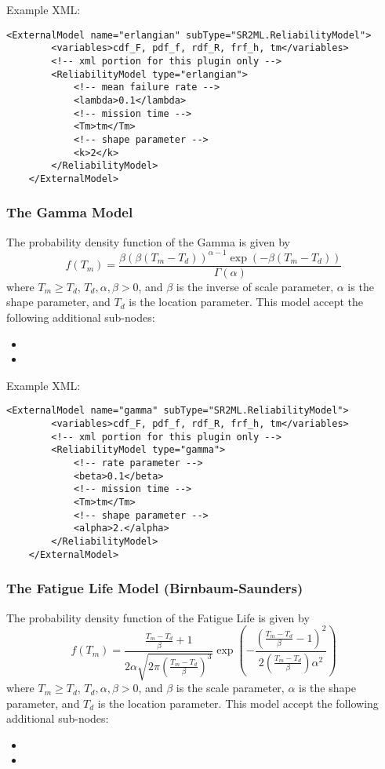 Example XML:
\begin{lstlisting}[style=XML]
	<ExternalModel name="erlangian" subType="SR2ML.ReliabilityModel">
		<variables>cdf_F, pdf_f, rdf_R, frf_h, tm</variables>
		<!-- xml portion for this plugin only -->
		<ReliabilityModel type="erlangian">
			<!-- mean failure rate -->
			<lambda>0.1</lambda>
			<!-- mission time -->
			<Tm>tm</Tm>
			<!-- shape parameter -->
			<k>2</k>
		</ReliabilityModel>
	</ExternalModel>
\end{lstlisting}


\subsubsection{The Gamma Model}
The probability density function of the Gamma is given by
\begin{equation}
	f(T_m) = \frac{\beta \left(\beta \left(T_m-T_d\right)\right)^{\alpha-1}\exp\left(-\beta\left(T_m-T_d\right)\right)}{\Gamma \left(\alpha\right)}
\end{equation}
where $T_m\geq T_d$, $T_d, \alpha, \beta >0$, and $\beta$ is the inverse of scale parameter, $\alpha$ is the shape
parameter, and $T_d$ is the location parameter.
This model accept the following additional sub-nodes:
\begin{itemize}
	\item {}
	\item {}
\end{itemize}

Example XML:
\begin{lstlisting}[style=XML]
	<ExternalModel name="gamma" subType="SR2ML.ReliabilityModel">
		<variables>cdf_F, pdf_f, rdf_R, frf_h, tm</variables>
		<!-- xml portion for this plugin only -->
		<ReliabilityModel type="gamma">
			<!-- rate parameter -->
			<beta>0.1</beta>
			<!-- mission time -->
			<Tm>tm</Tm>
			<!-- shape parameter -->
			<alpha>2.</alpha>
		</ReliabilityModel>
	</ExternalModel>
\end{lstlisting}


\subsubsection{The Fatigue Life Model (Birnbaum-Saunders)}
The probability density function of the Fatigue Life is given by
\begin{equation}
	f(T_m) = \frac{\frac{T_m-T_d}{\beta}+1}{2\alpha\sqrt{2\pi\left(\frac{T_m-T_d}{\beta}\right)^3}}
				 \exp\left(-\frac{\left(\frac{T_m-T_d}{\beta}-1\right)^2}{2\left(\frac{T_m-T_d}{\beta}\right)\alpha^2}\right)
\end{equation}
where $T_m\geq T_d$, $T_d, \alpha, \beta >0$, and $\beta$ is the scale parameter, $\alpha$ is the shape
parameter, and $T_d$ is the location parameter.
This model accept the following additional sub-nodes:
\begin{itemize}
	\item {}
	\item {}
\end{itemize}

